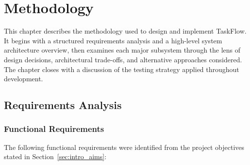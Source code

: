 \chapter{Methodology}\label{chap:Methodology}

This chapter describes the methodology used to design and implement TaskFlow.
It begins with a structured requirements analysis and a high-level system
architecture overview, then examines each major subsystem through the lens of
design decisions, architectural trade-offs, and alternative approaches considered.
The chapter closes with a discussion of the testing strategy applied throughout
development.

\section{Requirements Analysis}\label{sec:meth_requirements}

\subsection*{Functional Requirements}

The following functional requirements were identified from the project objectives stated
in Section~\ref{sec:intro_aims}:

